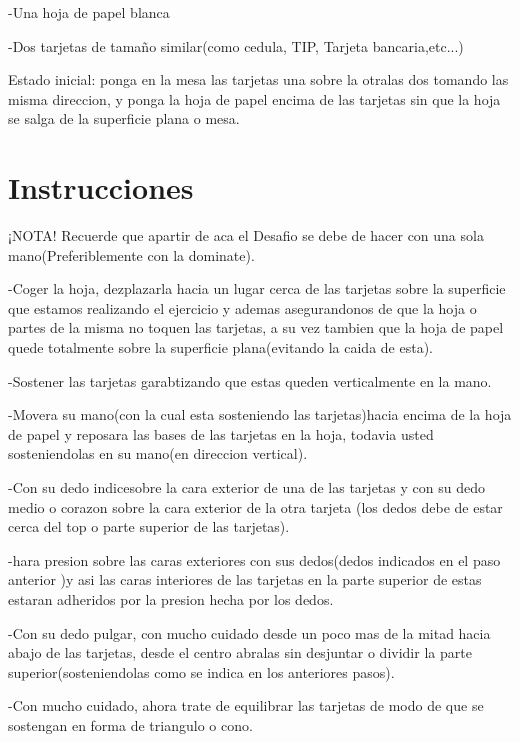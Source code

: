 \documentclass{article}
\begin{document}
    -Una hoja de papel blanca
    
    -Dos tarjetas de tamaño similar(como cedula, TIP, Tarjeta bancaria,etc...)
    
    Estado inicial: ponga en la mesa las tarjetas una sobre la otralas dos tomando las misma direccion, y ponga la hoja de papel encima de las tarjetas sin que la hoja se salga de la superficie plana o mesa.

\section{Instrucciones} \label{contenido}
    ¡NOTA! Recuerde que apartir de aca el Desafio se debe de hacer con una sola mano(Preferiblemente con la dominate).
    
    
    -Coger la hoja, dezplazarla hacia un lugar cerca de las tarjetas sobre la superficie que estamos realizando el ejercicio y ademas asegurandonos de que la hoja o partes de la misma no toquen las tarjetas, a su vez tambien que la hoja de papel quede totalmente sobre la superficie plana(evitando la caida de esta).

    
    -Sostener las tarjetas garabtizando que estas queden verticalmente en la mano.

    
    -Movera su mano(con la cual esta sosteniendo las tarjetas)hacia encima de la hoja de papel y reposara las bases de las tarjetas en la hoja, todavia    usted sosteniendolas en su mano(en direccion vertical).
 
    
    -Con su dedo indicesobre la cara exterior de una de las tarjetas y con su dedo medio o corazon sobre la cara exterior de la otra tarjeta (los dedos debe de estar cerca del top o parte superior de las tarjetas).

    
    -hara presion sobre las caras exteriores con sus dedos(dedos indicados en el paso anterior )y asi las caras interiores de las tarjetas en la parte superior de estas estaran adheridos por la presion hecha por los dedos.
   
    
    -Con su dedo pulgar, con mucho cuidado desde un poco mas de la mitad hacia abajo de las tarjetas, desde el centro abralas sin desjuntar o dividir la parte superior(sosteniendolas como se indica en los anteriores pasos).
    
    
    -Con mucho cuidado, ahora trate de equilibrar las tarjetas de modo de que se sostengan en forma de triangulo o cono.
\end{document}
